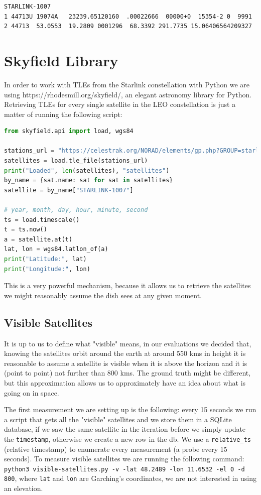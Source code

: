 \documentclass[IN,11pt,twoside,openright,bachelor,english]{tumthesis}
\begin{document}
\begin{lstlisting}[caption={TLE for satellite STARLINK-1007 },captionpos=b]
STARLINK-1007           
1 44713U 19074A   23239.65120160  .00022666  00000+0  15354-2 0  9991
2 44713  53.0553  19.2809 0001296  68.3392 291.7735 15.06406564209327
\end{lstlisting}

	
\section{Skyfield Library}

In order to work with TLEs from the Starlink constellation with Python we are using https://rhodesmill.org/skyfield/, an elegant astronomy library for Python. Retrieving TLEs for every single satellite in the LEO constellation is just a matter of running the following script:

\begin{lstlisting}[language=python,caption={retrieving a Satellite's position using the Satname},captionpos=b]
from skyfield.api import load, wgs84

stations_url = "https://celestrak.org/NORAD/elements/gp.php?GROUP=starlink&FORMAT=tle"
satellites = load.tle_file(stations_url)
print("Loaded", len(satellites), "satellites")
by_name = {sat.name: sat for sat in satellites}
satellite = by_name["STARLINK-1007"]

# year, month, day, hour, minute, second
ts = load.timescale()
t = ts.now()
a = satellite.at(t)
lat, lon = wgs84.latlon_of(a)
print("Latitude:", lat)
print("Longitude:", lon)
\end{lstlisting}

This is a very powerful mechanism, because it allows us to retrieve the satellites we might reasonably assume the dish sees at any given moment.
\subsection{Visible Satellites}
It is up to us to define what "visible" means, in our evaluations we decided that, knowing the satellites orbit around the earth at around 550 kms in height it is reasonable to assume a satellite is visible when it is above the horizon and it is (point to point) not further than 800 kms. The ground truth might be different, but this approximation allows us to approximately have an idea about what is going on in space. 

The first measurement we are setting up is the following: every 15 seconds we run a script that gets all the "visible" satellites and we store them in a SQLite database, if we saw the same satellite in the iteration before we simply update the \texttt{timestamp}, otherwise we create a new row in the db. We use a \texttt{relative\_ts} (relative timestamp) to enumerate every measurement (a probe every 15 seconds). To measure visible satellites we are running the following command: \texttt{python3 visible-satellites.py -v -lat 48.2489 -lon 11.6532 -el 0 -d 800}, where \texttt{lat} and \texttt{lon} are Garching's coordinates, we are not interested in using an elevation.
\end{document}

